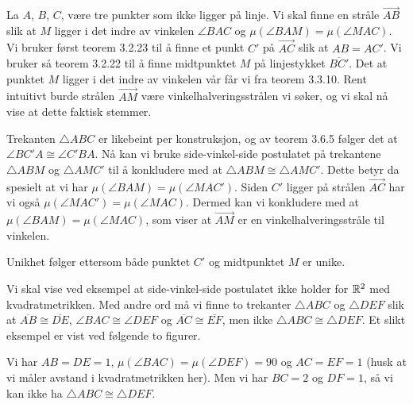 
\begin{oppgave}[3.6.1]
    La $A$, $B$, $C$, være tre punkter som ikke ligger på linje. Vi skal finne en stråle $\overrightarrow{AB}$ slik at $M$ ligger i det indre av vinkelen $\angle BAC$ og $\mu(\angle BAM)=\mu(\angle MAC)$.
    Vi bruker først teorem 3.2.23 til å finne et punkt $C'$ på $\overrightarrow{AC}$ slik at $AB=AC'$. 
    Vi bruker så teorem 3.2.22 til å finne midtpunktet $M$ på linjestykket $\overline{BC'}$.
    Det at punktet $M$ ligger i det indre av vinkelen vår får vi fra teorem 3.3.10. 
    Rent intuitivt burde strålen $\overrightarrow{AM}$ være vinkelhalveringsstrålen vi søker, og vi skal nå vise at dette faktisk stemmer. 

    Trekanten $\triangle ABC$ er likebeint per konstruksjon, og av teorem 3.6.5 følger det at $\angle BC'A \cong \angle C'BA$. 
    Nå kan vi bruke side-vinkel-side postulatet på trekantene $\triangle ABM$ og $\triangle AMC'$ til å konkludere med at $\triangle ABM \cong \triangle AMC'$. 
    Dette betyr da spesielt at vi har $\mu(\angle BAM) = \mu(\angle MAC')$.
    Siden $C'$ ligger på strålen $\overrightarrow{AC}$ har vi også $\mu(\angle MAC') = \mu(\angle MAC)$.
    Dermed kan vi konkludere med at $\mu(\angle BAM) = \mu(\angle MAC)$, som viser at $\overrightarrow{AM}$ er en vinkelhalveringsstråle til vinkelen. 

    Unikhet følger ettersom både punktet $C'$ og midtpunktet $M$ er unike. 

    \begin{figure}
        
    \end{figure}
\end{oppgave}

\begin{oppgave}[3.6.2]
    Vi skal vise ved eksempel at side-vinkel-side postulatet ikke holder for $\mathbb{R}^2$ med kvadratmetrikken.
    Med andre ord må vi finne to trekanter $\triangle ABC$ og $\triangle DEF$ slik at $\overline{AB}\cong \overline{DE}$, $\angle BAC \cong \angle DEF$ og $\overline{AC}\cong \overline{EF}$, men ikke $\triangle ABC\cong\triangle DEF$.
    Et slikt eksempel er vist ved følgende to figurer.
    
    \begin{figure}
        
    \end{figure}
    
    Vi har $AB=DE=1$, $\mu(\angle BAC) = \mu(\angle DEF) = 90$ og $AC=EF=1$ (husk at vi måler avstand i kvadratmetrikken her). 
    Men vi har $BC=2$ og $DF=1$, så vi kan ikke ha $\triangle ABC\cong \triangle DEF$. 
\end{oppgave}

